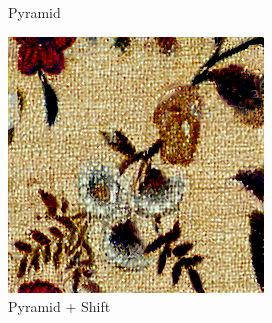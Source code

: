 \begin{figure}[ht]
\begin{subfigure}{0.8\textwidth}
\begin{subfigure}{0.32\textwidth}
            \caption{Pyramid}
            \label{fig:methods_comparison_small-pyramid}
        \end{subfigure}
        \hfill
        \begin{subfigure}{0.32\textwidth}
            \centering
            \includegraphics[width=\textwidth]{images/03-comparison_small_pyramid_shift.jpg}
            \caption{Pyramid + Shift}
            \label{fig:methods_comparison_small-pyramid_shift}
        \end{subfigure}
        \vskip 20pt
        \begin{subfigure}{0.32\textwidth}
            \centering
            \begin{tikzpicture}

\end{tikzpicture}
\end{subfigure}
\end{subfigure}
\end{figure}
